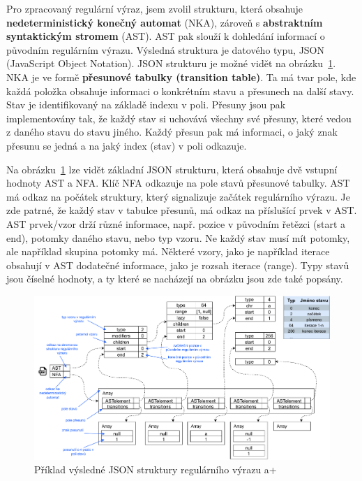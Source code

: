 Pro zpracovaný regulární výraz, jsem zvolil strukturu, která obsahuje \textbf{nedeterministický konečný automat} (NKA), zároveň s \textbf{abstraktním syntaktickým stromem} (AST).
AST pak slouží k dohledání informací o původním regulárním výrazu. 
Výsledná struktura je datového typu, JSON (JavaScript Object Notation).
JSON strukturu je možné vidět na obrázku~\ref{fig:JSONex}.
NKA je ve formě \textbf{přesunové tabulky (transition table)}. 
Ta má tvar pole, kde každá položka obsahuje informaci o konkrétním stavu a přesunech na další stavy.
Stav je identifikovaný na základě indexu v poli. 
Přesuny jsou pak implementovány tak, že každý stav si uchovává všechny své přesuny, které vedou z daného stavu do stavu jiného.
Každý přesun pak má informaci, o jaký znak přesunu se jedná a na jaký index (stav) v poli odkazuje. 

Na obrázku~\ref{fig:JSONex} lze vidět základní JSON strukturu, která obsahuje dvě vstupní hodnoty AST a NFA.
Klíč NFA odkazuje na pole stavů přesunové tabulky. 
AST má odkaz na počátek struktury, který signalizuje začátek regulárního výrazu.
Je zde patrné, že každý stav v tabulce přesunů, má odkaz na příslušící prvek v AST. 
AST prvek/vzor drží různé informace, např. pozice v původním řetězci (start a end), 
potomky daného stavu, nebo typ vzoru. 
Ne každý stav musí mít potomky, ale například skupina potomky má.
Některé vzory, jako je například iterace obsahují v AST dodatečné informace, jako je rozsah iterace (range).
Typy stavů jsou číselné hodnoty, a ty které se nacházejí na obrázku jsou zde také popsány.

\begin{figure}[!h]
	\centering
	\includegraphics[width=1\textwidth]{Figures/BP-JSON.pdf}
	\caption{Příklad výsledné JSON struktury regulárního výrazu a+}
	\label{fig:JSONex}
\end{figure}

